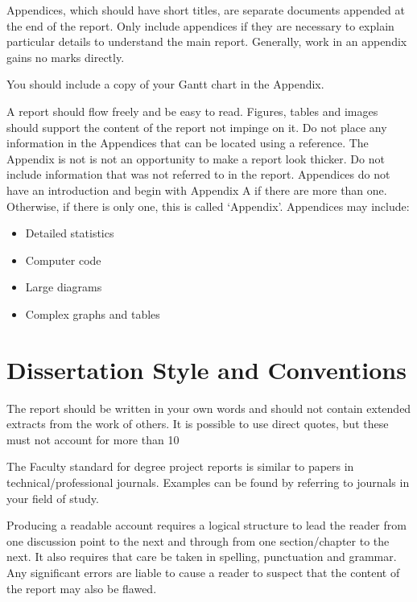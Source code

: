 \documentclass{BCUDissertation}
\begin{document}
\begin{appendices}
    Appendices, which should have short titles, are separate documents appended at the end of the report. Only include appendices if they are necessary to explain particular details to understand the main report. Generally, work in an appendix gains no marks directly.
        
    You should include a copy of your Gantt chart in the Appendix.
        
    A report should flow freely and be easy to read.  Figures, tables and images should support the content of the report not impinge on it. Do not place any information in the Appendices that can be located using a reference. The Appendix is not is not an opportunity to make a report look thicker.  Do not include information that was not referred to in the report. Appendices do not have an introduction and begin with Appendix A if there are more than one. Otherwise, if there is only one, this is called ‘Appendix’. Appendices may include:
        
    \begin{itemize}
        \item Detailed statistics
        \item Computer code
        \item Large diagrams
        \item Complex graphs and tables
    \end{itemize}

\section{Dissertation Style and Conventions}
\label{app:Stuff}
    The report should be written in your own words and should not contain extended extracts from the work of others. It is possible to use direct quotes, but these must not account for more than 10%
        
    The Faculty standard for degree project reports is similar to papers in technical/professional journals. Examples can be found by referring to journals in your field of study.
    
    Producing a readable account requires a logical structure to lead the reader from one discussion point to the next and through from one section/chapter to the next. It also requires that care be taken in spelling, punctuation and grammar. Any significant errors are liable to cause a reader to suspect that the content of the report may also be flawed.
        

\end{appendices}
\end{document}

